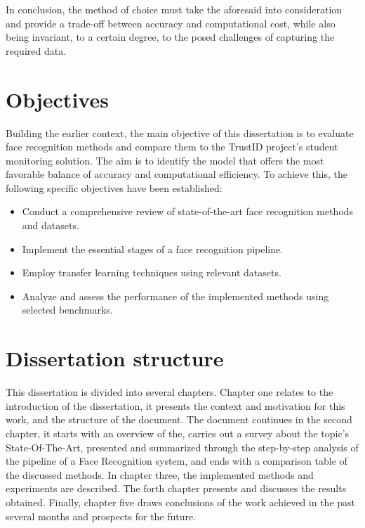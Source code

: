 \documentclass[class=report, crop=false, a4paper, 12pt]{standalone}
\begin{document}
\par In conclusion, the method of choice must take the aforesaid into consideration and provide a trade-off between accuracy and computational cost, while also being invariant, to a certain degree, to the posed challenges of capturing the required data. 

\section{Objectives}
Building  the earlier context, the main objective of this dissertation is to evaluate face recognition methods and compare them to the TrustID project's student monitoring solution. The aim is to identify the model that offers the most favorable balance of accuracy and computational efficiency. To achieve this, the following specific objectives have been established:
\begin{itemize}
    \item Conduct a comprehensive review of state-of-the-art face recognition methods and datasets.
    \item Implement the essential stages of a face recognition pipeline.
    \item Employ transfer learning techniques using relevant datasets.
    \item Analyze and assess the performance of the implemented methods using selected benchmarks.
\end{itemize}

\section{Dissertation structure}
\par This dissertation is divided into several chapters. Chapter one relates to the introduction of the dissertation, it presents the context and motivation for this work, and the structure of the document. The document continues in the second chapter, it starts with an overview of the, carries out a survey about the topic's State-Of-The-Art, presented and summarized through the step-by-step analysis of the pipeline of a Face Recognition system, and ends with a comparison table of the discussed methods. In chapter three, the implemented methods and experiments are described. The forth chapter presents and discusses the results obtained. Finally, chapter five draws conclusions of the work achieved in the past several months and prospects for the future.
\end{document}
